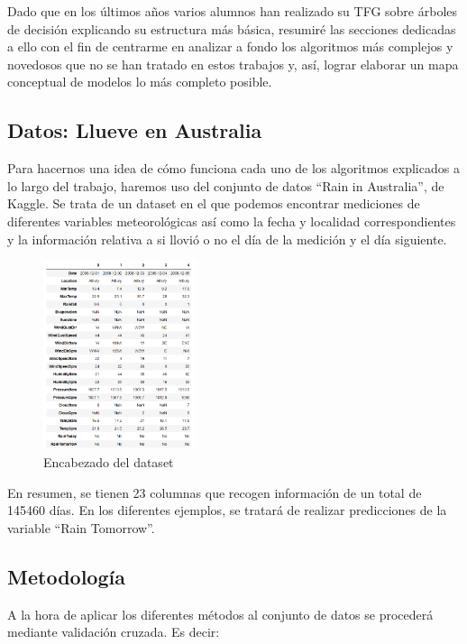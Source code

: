 \documentclass[12pt,twoside]{article}
\begin{document}
Dado que en los últimos años varios alumnos han realizado su TFG sobre árboles de decisión explicando su estructura más básica, resumiré las secciones dedicadas a ello con el fin de centrarme en analizar a fondo los algoritmos más complejos y novedosos que no se han tratado en estos trabajos y, así, lograr elaborar un mapa conceptual de modelos lo más completo posible.



\subsection{Datos: Llueve en Australia} \label{sec: subsec11}

Para hacernos una idea de cómo funciona cada uno de los algoritmos explicados a lo largo del trabajo, haremos uso del conjunto de datos ``Rain in Australia'', de Kaggle. Se trata de un dataset en el que podemos encontrar mediciones de diferentes variables meteorológicas así como la fecha y localidad correspondientes y la información relativa a si llovió o no el día de la medición y el día siguiente.
\begin{figure}[h]
	\centering
	\includegraphics[width = 0.4\textwidth]{Intro_01}
	\caption{Encabezado del dataset}
\end{figure}

En resumen, se tienen 23 columnas que recogen información de un total de 145460 días. En los diferentes ejemplos, se tratará de realizar predicciones de la variable ``Rain Tomorrow''.


\subsection{Metodología} \label{subsec:Metodología}

A la hora de aplicar los diferentes métodos al conjunto de datos se procederá mediante validación cruzada. Es decir:
\end{document}
